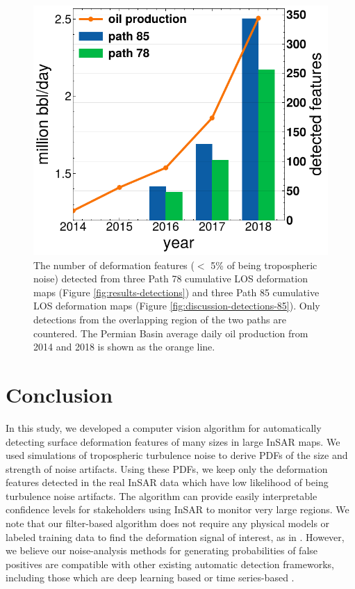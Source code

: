 	\begin{figure}[hbt!]
		\centering 
		\includegraphics[width=0.98\linewidth]{paper2/figures/figure_discussion_oil_vs_blob_count.pdf}
		\caption[Number of detected deformation figures and yearly oil production]{
			The number of deformation features ($<$ 5\% of being tropospheric noise) detected from three Path 78 cumulative LOS deformation maps (Figure \ref{fig:results-detections}) and three Path 85 cumulative LOS deformation maps (Figure \ref{fig:discussion-detections-85}). Only detections from the overlapping region of the two paths are countered. The Permian Basin average daily oil production from 2014 and 2018 is shown as the orange line.
		}
		\label{fig:discussion-oil-blob-count}
	\end{figure}
	
	
	
	\section{Conclusion}
	
	In this study, we developed a computer vision algorithm for automatically detecting surface deformation features of many sizes in large InSAR maps. We used simulations of tropospheric turbulence noise to derive PDFs of the size and strength of noise artifacts. Using these PDFs, we keep only the deformation features detected in the real InSAR data which have low likelihood of being turbulence noise artifacts. The algorithm can provide easily interpretable confidence levels for stakeholders using InSAR to monitor very large regions. We note that our filter-based algorithm does not require any physical models or labeled training data to find the deformation signal of interest, as in \cite{RouetLeduc2021AutonomousExtractionMillimeter}. However, we believe our noise-analysis methods for generating probabilities of false positives are compatible with other existing automatic detection frameworks, including those which are deep learning based \cite{Anantrasirichai2018ApplicationMachineLearning, Anantrasirichai2019ApplicationConvolutionalNeural, Valade2019TowardsGlobalVolcano} or time series-based \cite{Raspini2018ContinuousSemiAutomatic, Tomas2019SemiAutomaticIdentification}.
	
	
	
